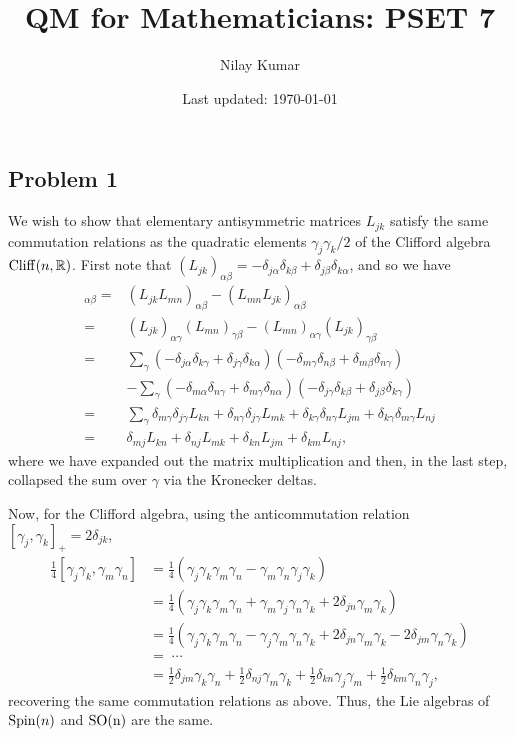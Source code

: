 \documentclass{../mathnotes}
\title{QM for Mathematicians: PSET 7}
\author{Nilay Kumar}
\date{Last updated: \today}
\begin{document}
\maketitle

\subsection*{Problem 1}

We wish to show that elementary antisymmetric matrices $L_{jk}$ satisfy the same commutation relations as the quadratic elements
$\gamma_j\gamma_k/2$ of the Clifford algebra ${\rm Cliff}(n,\mathbb{R})$. First note that $(L_{jk})_{\alpha\beta}=-\delta_{j\alpha}\delta_{k\beta}
+\delta_{j\beta}\delta_{k\alpha}$, and so we have
\begin{align*}
    [L_{jk}, L_{mn}]_{\alpha\beta}=&(L_{jk}L_{mn})_{\alpha\beta}-(L_{mn}L_{jk})_{\alpha\beta}\\
    =&(L_{jk})_{\alpha\gamma}(L_{mn})_{\gamma\beta}-(L_{mn})_{\alpha\gamma}(L_{jk})_{\gamma\beta}\\
    =&\sum_\gamma\left( -\delta_{j\alpha}\delta_{k\gamma}+\delta_{j\gamma}\delta_{k\alpha} \right) \left( -\delta_{m\gamma}\delta_{n\beta}+\delta_{m\beta}\delta_{n\gamma} \right)\\
    &-\sum_\gamma\left( -\delta_{m\alpha}\delta_{n\gamma}+\delta_{m\gamma}\delta_{n\alpha} \right) \left( -\delta_{j\gamma}\delta_{k\beta}+\delta_{j\beta}\delta_{k\gamma} \right)\\
    =&\sum_\gamma\delta_{m\gamma}\delta_{j\gamma}L_{kn}+\delta_{n\gamma}\delta_{j\gamma}L_{mk}+\delta_{k\gamma}\delta_{n\gamma}L_{jm}+\delta_{k\gamma}\delta_{m\gamma}L_{nj}\\
    =&\delta_{mj}L_{kn}+\delta_{nj}L_{mk}+\delta_{kn}L_{jm}+\delta_{km}L_{nj},
\end{align*}
where we have expanded out the matrix multiplication and then, in the last step, collapsed the sum over $\gamma$ via the Kronecker deltas.

Now, for the Clifford algebra, using the anticommutation relation $[\gamma_j,\gamma_k]_+=2\delta_{jk}$,
\begin{align*}
    \frac{1}{4}[\gamma_j\gamma_k,\gamma_m\gamma_n]&=\frac{1}{4}\left(\gamma_j\gamma_k\gamma_m\gamma_n-\gamma_m\gamma_n\gamma_j\gamma_k\right)\\
    &=\frac{1}{4}\left(\gamma_j\gamma_k\gamma_m\gamma_n+\gamma_m\gamma_j\gamma_n\gamma_k+2\delta_{jn}\gamma_m\gamma_k\right)\\
    &=\frac{1}{4}\left(\gamma_j\gamma_k\gamma_m\gamma_n-\gamma_j\gamma_m\gamma_n\gamma_k+2\delta_{jn}\gamma_m\gamma_k-2\delta_{jm}\gamma_n\gamma_k\right)\\
    &=\;\cdots\\
    &=\frac{1}{2}\delta_{jm}\gamma_k\gamma_n+\frac{1}{2}\delta_{nj}\gamma_m\gamma_k+\frac{1}{2}\delta_{kn}\gamma_j\gamma_m+\frac{1}{2}\delta_{km}\gamma_n\gamma_j,
\end{align*}
recovering the same commutation relations as above. Thus, the Lie algebras of ${\rm Spin}(n)$ and ${\rm SO(n)}$ are the same.
\end{document}

